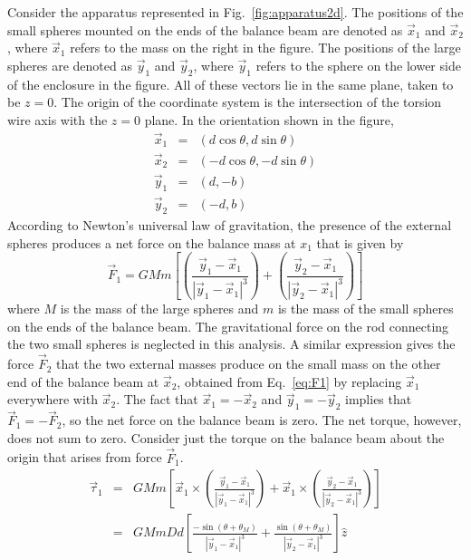 \documentclass{revtex4}
\begin{document}
Consider the apparatus represented in Fig.~\ref{fig:apparatus2d}.  The 
positions of the small spheres mounted on the ends of the balance beam
are denoted as $\vec{x}_1$ and $\vec{x}_2$, where $\vec{x}_1$ refers to 
the mass on the right in the figure.  The positions of the large spheres
are denoted as $\vec{y}_1$ and $\vec{y}_2$, where $\vec{y}_1$ refers to
the sphere on the lower side of the enclosure in the figure.  All of these
vectors lie in the same plane, taken to be $z=0$.  The origin
of the coordinate system is the intersection of the torsion wire axis
with the $z=0$ plane.  In the orientation shown in the figure,
\begin{eqnarray}
\vec{x}_1 &=& (d\cos\theta,d\sin\theta)
\nonumber \\
\vec{x}_2 &=& (-d\cos\theta,-d\sin\theta)
\nonumber \\
\vec{y}_1 &=& (d,-b)
\nonumber \\
\vec{y}_2 &=& (-d,b)
\end{eqnarray}
According to Newton's universal law of gravitation, the presence of the
external spheres produces a net force on the balance mass at $x_1$ that
is given by
\begin{equation}
\vec{F}_1 = GMm\left[
\left(\frac{\vec{y}_1-\vec{x}_1}{|\vec{y}_1-\vec{x}_1|^3}\right)+
\left(\frac{\vec{y}_2-\vec{x}_1}{|\vec{y}_2-\vec{x}_1|^3}\right)
\right]
\label{eq:F1}
\end{equation}
where $M$ is the mass of the large spheres and $m$ is the mass of the small
spheres on the ends of the balance beam.  The gravitational force on the rod
connecting the two small spheres is neglected in this analysis.
A similar expression gives the force $\vec{F}_2$ that the two external masses
produce on the small mass on the other end of the balance beam at $\vec{x}_2$,
obtained from Eq.~\ref{eq:F1} by replacing $\vec{x}_1$ everywhere with
$\vec{x}_2$.  The fact that $\vec{x}_1=-\vec{x}_2$ and $\vec{y}_1=-\vec{y}_2$
implies that $\vec{F}_1=-\vec{F}_2$, so the net force on the balance beam is
zero.  The net torque, however, does not sum to zero.  Consider just the
torque on the balance beam about the origin that arises from force $\vec{F}_1$.
\begin{eqnarray}
\vec{\tau}_1 &=& GMm\left[
\vec{x}_1\times
\left(\frac{\vec{y}_1-\vec{x}_1}{|\vec{y}_1-\vec{x}_1|^3}\right)+
\vec{x}_1\times
\left(\frac{\vec{y}_2-\vec{x}_1}{|\vec{y}_2-\vec{x}_1|^3}\right)
\right]
\nonumber\\
&=& GMmDd\left[
\frac{-\sin(\theta+\theta_M)}{|\vec{y}_1-\vec{x}_1|^3}+
\frac{\sin(\theta+\theta_M)}{|\vec{y}_2-\vec{x}_1|^3}
\right]\hat{z}
\end{eqnarray}
\end{document}

